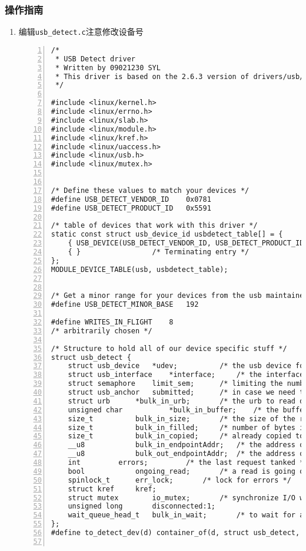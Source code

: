 \documentclass{article}
\begin{document}
\subsubsection{操作指南}
\begin{enumerate}
	\item 编辑\verb|usb_detect.c|注意修改设备号
\begin{lstlisting}[numbers=left]
/*
 * USB Detect driver
 * Written by 09021230 SYL
 * This driver is based on the 2.6.3 version of drivers/usb/usb-skeleton.c
 */

#include <linux/kernel.h>
#include <linux/errno.h>
#include <linux/slab.h>
#include <linux/module.h>
#include <linux/kref.h>
#include <linux/uaccess.h>
#include <linux/usb.h>
#include <linux/mutex.h>


/* Define these values to match your devices */
#define USB_DETECT_VENDOR_ID	0x0781
#define USB_DETECT_PRODUCT_ID	0x5591

/* table of devices that work with this driver */
static const struct usb_device_id usbdetect_table[] = {
	{ USB_DEVICE(USB_DETECT_VENDOR_ID, USB_DETECT_PRODUCT_ID) },
	{ }					/* Terminating entry */
};
MODULE_DEVICE_TABLE(usb, usbdetect_table);


/* Get a minor range for your devices from the usb maintainer */
#define USB_DETECT_MINOR_BASE	192

#define WRITES_IN_FLIGHT	8
/* arbitrarily chosen */

/* Structure to hold all of our device specific stuff */
struct usb_detect {
	struct usb_device	*udev;			/* the usb device for this device */
	struct usb_interface	*interface;		/* the interface for this device */
	struct semaphore	limit_sem;		/* limiting the number of writes in progress */
	struct usb_anchor	submitted;		/* in case we need to retract our submissions */
	struct urb		*bulk_in_urb;		/* the urb to read data with */
	unsigned char           *bulk_in_buffer;	/* the buffer to receive data */
	size_t			bulk_in_size;		/* the size of the receive buffer */
	size_t			bulk_in_filled;		/* number of bytes in the buffer */
	size_t			bulk_in_copied;		/* already copied to user space */
	__u8			bulk_in_endpointAddr;	/* the address of the bulk in endpoint */
	__u8			bulk_out_endpointAddr;	/* the address of the bulk out endpoint */
	int			errors;			/* the last request tanked */
	bool			ongoing_read;		/* a read is going on */
	spinlock_t		err_lock;		/* lock for errors */
	struct kref		kref;
	struct mutex		io_mutex;		/* synchronize I/O with disconnect */
	unsigned long		disconnected:1;
	wait_queue_head_t	bulk_in_wait;		/* to wait for an ongoing read */
};
#define to_detect_dev(d) container_of(d, struct usb_detect, kref)


\end{lstlisting}
\end{enumerate}
\end{document}
